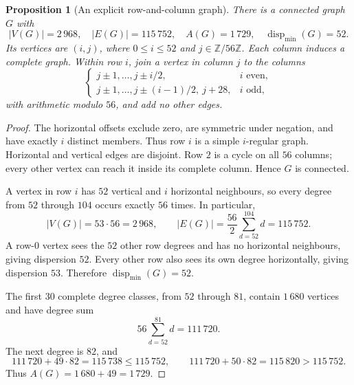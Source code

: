 \documentclass[11pt,a4paper]{article}
\newtheorem{proposition}[theorem]{Proposition}
\theoremstyle{remark}
\begin{document}
\begin{proposition}[An explicit row-and-column graph]\label{r5:construction400c}
There is a connected graph \(G\) with
\[
|V(G)|=2\,968,\quad |E(G)|=115\,752,\quad
A(G)=1\,729,\quad \operatorname{disp}_{\min}(G)=52.
\]
Its vertices are \((i,j)\), where \(0\le i\le52\) and
\(j\in\mathbb Z/56\mathbb Z\). Each column induces a complete graph.
Within row \(i\), join a vertex in column \(j\) to the columns
\[
\begin{cases}
j\pm1,\ldots,j\pm i/2,&i\text{ even},\\
j\pm1,\ldots,j\pm(i-1)/2,\ j+28,&i\text{ odd},
\end{cases}
\]
with arithmetic modulo \(56\), and add no other edges.
\end{proposition}
\begin{proof}
The horizontal offsets exclude zero, are symmetric under negation,
and have exactly \(i\) distinct members. Thus row \(i\) is a simple
\(i\)-regular graph. Horizontal and vertical edges are disjoint.
Row \(2\) is a cycle on all \(56\) columns; every other vertex can
reach it inside its complete column. Hence \(G\) is connected.

A vertex in row \(i\) has \(52\) vertical and \(i\) horizontal
neighbours, so every degree from \(52\) through \(104\) occurs
exactly \(56\) times. In particular,
\[
|V(G)|=53\cdot56=2\,968,\qquad
|E(G)|=\frac{56}{2}\sum_{d=52}^{104}d=115\,752.
\]
A row-\(0\) vertex sees the \(52\) other row degrees and has no
horizontal neighbours, giving dispersion \(52\). Every other row
also sees its own degree horizontally, giving dispersion \(53\).
Therefore \(\operatorname{disp}_{\min}(G)=52\).

The first \(30\) complete degree classes, from \(52\) through \(81\),
contain \(1\,680\) vertices and have degree sum
\[
56\sum_{d=52}^{81}d=111\,720.
\]
The next degree is \(82\), and
\[
111\,720+49\cdot82=115\,738\le115\,752,
\qquad
111\,720+50\cdot82=115\,820>115\,752.
\]
Thus \(A(G)=1\,680+49=1\,729\).
\end{proof}
\end{document}
